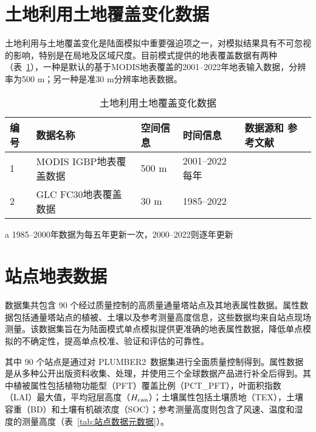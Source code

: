 \section{土地利用土地覆盖变化数据}

土地利用与土地覆盖变化是陆面模拟中重要强迫项之一，对模拟结果具有不可忽视的影响，特别是在局地及区域尺度。目前模式提供的地表覆盖数据有两种（表~\ref{tab:LULCC数据}），一种是默认的基于MODIS地表覆盖的2001--2022年地表输入数据，分辨率为500 m；另一种是准30 m分辨率地表数据。

\begin{table}[htbp]
  \begin{threeparttable}
    \centering
    \caption{土地利用土地覆盖变化数据}
    \label{tab:LULCC数据}
    \begin{tabular}{p{1cm}p{4.5cm}p{2cm}p{3cm}p{3cm}}
      \toprule
      编号 & 数据名称               & 空间信息 & 时间信息            & 数据源和 \newline 参考文献 \\
      \midrule
      1    & MODIS IGBP地表覆盖数据 & 500 m    & 2001--2022每年      & \cite{Friedl2019}          \\
      2    & GLC FC30地表覆盖数据   & 30 m     & 1985--2022\tnote{a} & \cite{zhang2023glc_fcs30d} \\
      \bottomrule
    \end{tabular}
    \begin{tablenotes}
    \item [a] 1985--2000年数据为每五年更新一次，2000--2022则逐年更新
    \end{tablenotes}
  \end{threeparttable}
\end{table}


\section{站点地表数据}

数据集共包含 90 个经过质量控制的高质量通量塔站点及其地表属性数据。属性数据包括通量塔站点的植被、土壤以及参考测量高度信息，这些数据均来自站点现场测量。该数据集旨在为陆面模式单点模拟提供更准确的地表属性数据，降低单点模拟的不确定性，提高单点校准、验证和评估的可靠性。

其中 90 个站点是通过对 PLUMBER2~\citep{ukkola2022flux}数据集进行全面质量控制得到。属性数据是从多种公开出版资料收集、处理，并使用三个全球数据产品进行补全后得到。其中植被属性包括植物功能型（PFT）覆盖比例（PCT\_PFT），叶面积指数
（LAI）最大值，平均冠层高度（$H_{\rm can}$）；土壤属性包括土壤质地（TEX），土壤容重（BD）和土壤有机碳浓度（SOC）；参考测量高度则包含了风速、温度和湿度的测量高度（表~\ref{tab:站点数据元数据}）。


